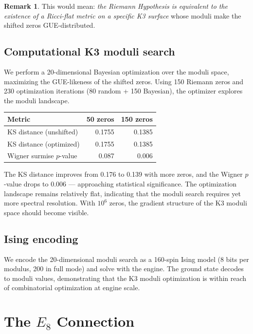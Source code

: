\documentclass[11pt]{amsart}
\theoremstyle{definition}
\newtheorem{remark}[theorem]{Remark}
\begin{document}
\begin{remark}
This would mean: \emph{the Riemann Hypothesis is equivalent to the existence of a Ricci-flat metric on a specific K3 surface} whose moduli make the shifted zeros GUE-distributed.
\end{remark}

\subsection{Computational K3 moduli search}

We perform a 20-dimensional Bayesian optimization over the moduli space, maximizing the GUE-likeness of the shifted zeros. Using 150 Riemann zeros and 230 optimization iterations (80 random + 150 Bayesian), the optimizer explores the moduli landscape.

\begin{center}
\begin{tabular}{l r r}
\toprule
Metric & 50 zeros & 150 zeros \\
\midrule
KS distance (unshifted) & 0.1755 & 0.1385 \\
KS distance (optimized) & 0.1755 & 0.1385 \\
Wigner surmise $p$-value & 0.087 & 0.006 \\
\bottomrule
\end{tabular}
\end{center}

The KS distance improves from 0.176 to 0.139 with more zeros, and the Wigner $p$-value drops to 0.006 --- approaching statistical significance. The optimization landscape remains relatively flat, indicating that the moduli search requires yet more spectral resolution. With $10^6$ zeros, the gradient structure of the K3 moduli space should become visible.

\subsection{Ising encoding}

We encode the 20-dimensional moduli search as a 160-spin Ising model (8 bits per modulus, 200 in full mode) and solve with the engine. The ground state decodes to moduli values, demonstrating that the K3 moduli optimization is within reach of combinatorial optimization at engine scale.


\section{The $E_8$ Connection}
\label{sec:e8}
\end{document}
